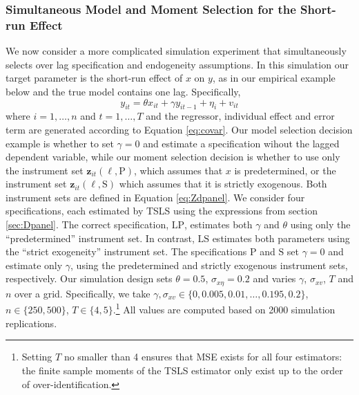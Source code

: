 \subsubsection{Simultaneous Model and Moment Selection for the Short-run Effect}
\label{sec:Dpanel_sim_SR}
We now consider a more complicated simulation experiment that simultaneously selects over lag specification and endogeneity assumptions. 
In this simulation our target parameter is the short-run effect of $x$ on $y$, as in our empirical example below and the true model contains one lag.
Specifically, 
\[
  y_{it} = \theta x_{it} + \gamma y_{it-1}  + \eta_i + v_{it}
\]
where $i = 1, \dots, n$ and $t = 1, \dots, T$ and the regressor, individual effect and error term are generated according to Equation \ref{eq:covar}.
Our model selection decision example is whether to set $\gamma = 0$ and estimate a specification wihout the lagged dependent variable, while our moment selection decision is whether to use only the instrument set $\mathbf{z}_{it}(\ell,\text{P})$, 
which assumes that $x$ is predetermined, or the instrument set $\mathbf{z}_{it}(\ell,\text{S})$ which assumes that it is strictly exogenous.
Both instrument sets are defined in Equation \ref{eq:Zdpanel}.
We consider four specifications, each estimated by TSLS using the expressions from section \ref{sec:Dpanel}.
The correct specification, $\text{LP}$, estimates both $\gamma$ and $\theta$ using only the ``predetermined'' instrument set.
In contrast, $\text{LS}$ estimates both parameters using the ``strict exogeneity'' instrument set.
The specifications $\text{P}$ and $\text{S}$ set $\gamma=0$ and estimate only $\gamma$, using the predetermined and strictly exogenous instrument sets, respectively.
Our simulation design sets $\theta = 0.5$, $\sigma_{x\eta}=0.2$ and varies  $\gamma$, $\sigma_{xv}$, $T$ and $n$ over a grid.
Specifically, we take $\gamma, \sigma_{xv} \in \{0, 0.005, 0.01, \hdots, 0.195, 0.2\}$, $n \in \{250,500\}$, $T \in \{4,5\}$.\footnote{Setting $T$ no smaller than 4 ensures that MSE exists for all four estimators: the finite sample moments of the TSLS estimator only exist up to the order of over-identification.}
All values are computed based on 2000 simulation replications.


